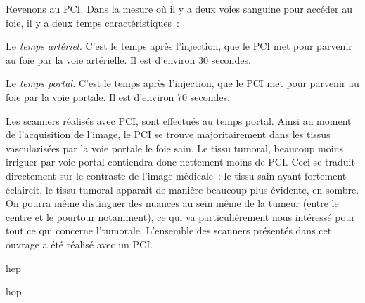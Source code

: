 \documentclass[main.tex]{subfiles}
\begin{document}
Revenons au PCI. Dans la mesure où il y a deux voies sanguine pour accéder au foie, il y a deux temps caractéristiques~:
\begin{myitemize}
\item Le \emph{temps artériel.} C'est le temps après l'injection, que le PCI met pour parvenir au foie par la voie artérielle. Il est d'environ 30 secondes.
\item Le \emph{temps portal.} C'est le temps après l'injection, que le PCI met pour parvenir au foie par la voie portale. Il est d'environ 70 secondes. 
\end{myitemize}
Les scanners réalisés avec PCI, sont effectués au temps portal. Ainsi au moment de l'acquisition de l'image, le PCI se trouve majoritairement dans les tissus vascularisées par la voie portale \ie le foie sain. Le tissu tumoral, beaucoup moins irriguer par voie portal contiendra donc nettement moins de PCI. Ceci se traduit directement sur le contraste de l'image médicale~: le tissu sain ayant fortement éclaircit, le tissu tumoral apparait de manière beaucoup plus évidente, en sombre. On pourra même distinguer des nuances au sein même de la tumeur (entre le centre et le pourtour notamment), ce qui va particulièrement nous intéressé pour tout ce qui concerne l'\hetero tumorale. L'ensemble des scanners présentés dans cet ouvrage a été réalisé avec un PCI.
\begin{myenumerate}
\item hep
\item hop
\end{myenumerate}
\end{document}
